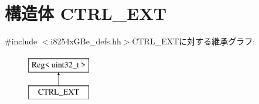 \hypertarget{structiGbReg_1_1Regs_1_1CTRL__EXT}{
\section{構造体 CTRL\_\-EXT}
\label{structiGbReg_1_1Regs_1_1CTRL__EXT}
}


{\ttfamily \#include $<$i8254xGBe\_\-defs.hh$>$}CTRL\_\-EXTに対する継承グラフ:\begin{figure}[H]
\begin{center}
\leavevmode
\includegraphics[height=2cm]{structiGbReg_1_1Regs_1_1CTRL__EXT}
\end{center}
\end{figure}
